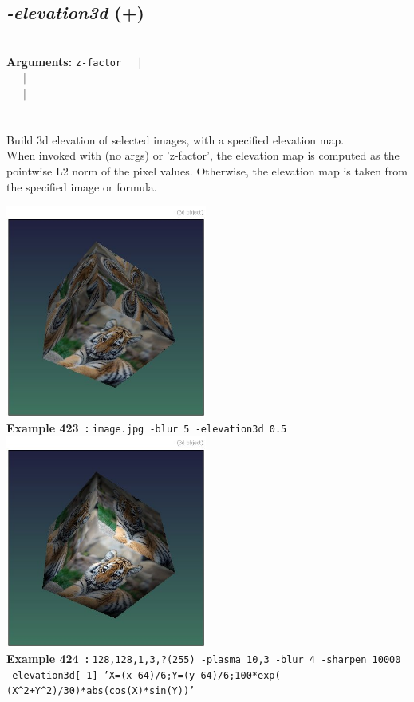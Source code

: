 \documentclass[a4paper,11pt,twoside]{book}
\begin{document}
\subsection{\emph{-elevation3d} (+)}\vspace*{-0.5em}
~\\\textbf{Arguments: } 
{\small \texttt{z-factor}}~~~$|$\\
~~~$|$\\
~~~$|$\\
\\~\\
Build 3d elevation of selected images, with a specified elevation map.
~\\When invoked with (no args) or 'z-factor', the elevation map is computed as the pointwise L2 norm of the
pixel values. Otherwise, the elevation map is taken from the specified image or formula.
\begin{center}\includegraphics[keepaspectratio=true,height=7cm,width=\textwidth]{img/gmic_def423.jpg}\\
{\footnotesize \textbf{Example 423~:} \texttt{image.jpg -blur 5 -elevation3d 0.5}}
\\\includegraphics[keepaspectratio=true,height=7cm,width=\textwidth]{img/gmic_def424.jpg}\\
{\footnotesize \textbf{Example 424~:} \texttt{128,128,1,3,?(255) -plasma 10,3 -blur 4 -sharpen 10000 -elevation3d[-1] 'X=(x-64)/6;Y=(y-64)/6;100*exp(-(X\textasciicircum 2+Y\textasciicircum 2)/30)*abs(cos(X)*sin(Y))'}}
\end{center}
\end{document}
